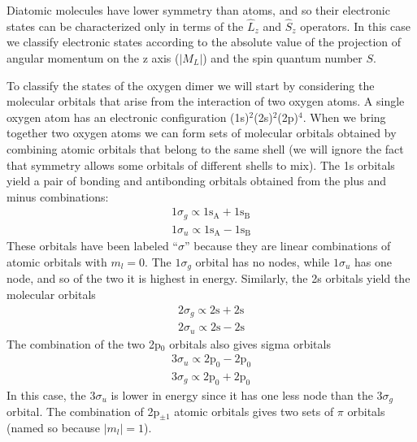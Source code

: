 \documentclass[../Main/chem532-notes.tex]{subfiles}
\begin{document}
\begin{example}
Diatomic molecules have lower symmetry than atoms, and so their electronic states can be characterized only in terms of the $\hat{L}_z$ and $\hat{S}_z$ operators.
In this case we classify electronic states according to the absolute value of the projection of angular momentum on the z axis ($|M_L|$) and the spin quantum number $S$.

To classify the states of the oxygen dimer we will start by considering the molecular orbitals that arise from the interaction of two oxygen atoms.
A single oxygen atom has an electronic configuration (1s)$^2$(2s)$^2$(2p)$^4$. When we bring together two oxygen atoms we can form sets of molecular orbitals obtained by combining atomic orbitals that belong to the same shell (we will ignore the fact that symmetry allows some orbitals of different shells to mix).
The 1s orbitals yield a pair of bonding and antibonding orbitals obtained from the plus and minus combinations:
\begin{equation}
\begin{split}
1\sigma_g  \propto \mathrm{1s_A + 1s_B} \\
1\sigma_u  \propto  \mathrm{1s_A - 1s_B}
\end{split}
\end{equation}
These orbitals have been labeled ``$\sigma$'' because they are linear combinations of atomic orbitals with $m_l = 0$.
The $1\sigma_g$ orbital has no nodes, while $1\sigma_u$ has one node, and so of the two it is highest in energy.
Similarly, the 2s orbitals yield the molecular orbitals
\begin{equation}
\begin{split}
2\sigma_g  \propto \mathrm{2s + 2s} \\
2\sigma_u  \propto  \mathrm{2s - 2s}
\end{split}
\end{equation}
The combination of the two 2p$_0$ orbitals also gives sigma orbitals
\begin{equation}
\begin{split}
3\sigma_u  \propto \mathrm{2p_0 - 2p_0} \\
3\sigma_g  \propto  \mathrm{2p_0 + 2p_0}
\end{split}
\end{equation}
In this case, the $3\sigma_u$ is lower in energy since it has one less node than the $3\sigma_g$ orbital.
The combination of 2p$_{\pm 1}$ atomic orbitals gives two sets of $\pi$ orbitals (named so because $|m_l| = 1$).

\end{example}
\end{document}
